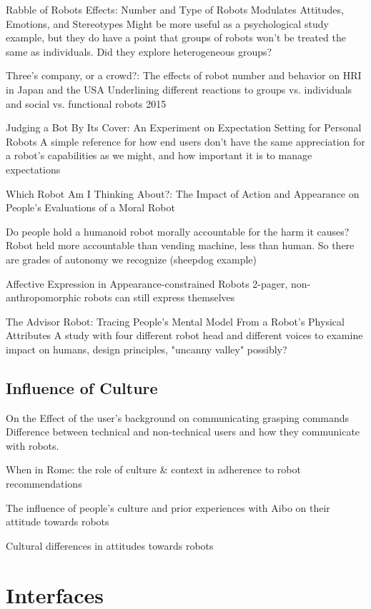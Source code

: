 \documentclass{sfuthesis}
\begin{document}
Rabble of Robots Effects: Number and Type of Robots Modulates Attitudes, Emotions, and Stereotypes	Might be more useful as a psychological study example, but they do have a point that groups of robots won't be treated the same as individuals. Did they explore heterogeneous groups?	

Three's company, or a crowd?: The effects of robot number and behavior on HRI in Japan and the USA	Underlining different reactions to groups vs. individuals and social vs. functional robots	2015

Judging a Bot By Its Cover: An Experiment on Expectation Setting for Personal Robots	A simple reference for how end users don't have the same appreciation for a robot's capabilities as we might, and how important it is to manage expectations	

Which Robot Am I Thinking About?: The Impact of Action and Appearance on People's Evaluations of a Moral Robot	

Do people hold a humanoid robot morally accountable for the harm it causes?	Robot held more accountable than vending machine, less than human. So there are grades of autonomy we recognize (sheepdog example)

Affective Expression in Appearance-constrained Robots	2-pager, non-anthropomorphic robots can still express themselves

The Advisor Robot: Tracing People's Mental Model From a Robot's Physical Attributes	A study with four different robot head and different voices to examine impact on humans, design principles, "uncanny valley" possibly?	

\subsection{Influence of Culture}

On the Effect of the user's background on communicating grasping commands	Difference between technical and non-technical users and how they communicate with robots.

When in Rome: the role of culture & context in adherence to robot recommendations

The influence of people’s culture and prior experiences with Aibo on their attitude towards robots

Cultural differences in attitudes towards robots




\section{Interfaces}
\end{document}
